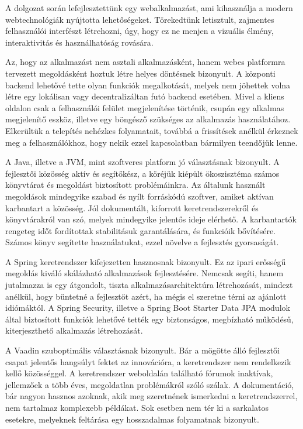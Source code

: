 A dolgozat során lefejlesztettünk egy webalkalmazást, ami kihasználja a modern webtechnológiák nyújtotta lehetőségeket. Törekedtünk letisztult, zajmentes felhasználói interfészt létrehozni, úgy, hogy ez ne menjen a vizuális élmény, interaktivitás és használhatóság rovására. \par

Az, hogy az alkalmazást nem asztali alkalmazásként, hanem webes platformra tervezett megoldásként hoztuk létre helyes döntésnek bizonyult. A központi backend lehetővé tette olyan funkciók megalkotását, melyek nem jöhettek volna létre egy lokálisan vagy decentralizáltan futó backend esetében. Mivel a kliens oldalon csak a felhasználói felület megjelenítése történik, csupán egy alkalmas megjelenítő eszköz, illetve egy böngésző szükséges az alkalmazás használatához. Elkerültük a telepítés nehézkes folyamatait, továbbá a frissítések anélkül érkeznek meg a felhasználókhoz, hogy nekik ezzel kapcsolatban bármilyen teendőjük lenne. \par

A Java, illetve a JVM, mint szoftveres platform jó választásnak bizonyult. A fejlesztői közösség aktív és segítőkész, a köréjük kiépült ökoszisztéma számos könyvtárat és megoldást biztosított problémáinkra. Az általunk használt megoldások mindegyike szabad és nyílt forráskódú szoftver, amiket aktívan karbantart a közösség. Jól dokumentált, kiforrott keretrendszerekről és könyvtárakról van szó, melyek mindegyike jelentős ideje elérhető. A karbantartók rengeteg időt fordítottak stabilitásuk garantálására, és funkcióik bővítésére. Számos könyv segítette használatukat, ezzel növelve a fejlesztés gyorsaságát. \par

A Spring keretrendszer kifejezetten hasznosnak bizonyult. Ez az ipari erősségű megoldás kiváló skálázható alkalmazások fejlesztésére. Nemcsak segíti, hanem jutalmazza is egy átgondolt, tiszta alkalmazásarchitektúra létrehozását, mindezt anélkül, hogy büntetné a fejlesztőt azért, ha mégis el szeretne térni az ajánlott idiómáktól. A Spring Security, illetve a Spring Boot Starter Data JPA modulok által biztosított funkciók lehetővé tették egy biztonságos, megbízható működésű, kiterjeszthető alkalmazás létrehozását. \par

A Vaadin szuboptimális választásnak bizonyult. Bár a mögötte álló fejlesztői csapat jelentős hangsúlyt fektet az innovációra, a keretrendszer nem rendelkezik kellő közösséggel. A keretrendszer weboldalán található fórumok inaktívak, jellemzőek a több éves, megoldatlan problémákról szóló szálak. A dokumentáció, bár nagyon hasznos azoknak, akik meg szeretnének ismerkedni a keretrendszerrel, nem tartalmaz komplexebb példákat. Sok esetben nem tér ki a sarkalatos esetekre, melyeknek feltárása egy hosszadalmas folyamatnak bizonyult. \par

